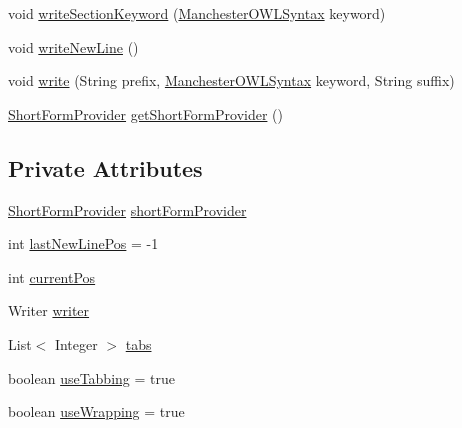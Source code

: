 \begin{DoxyCompactItemize}
\item 
void \hyperlink{classuk_1_1ac_1_1manchester_1_1cs_1_1owl_1_1owlapi_1_1mansyntaxrenderer_1_1_abstract_renderer_a13cf12a873d036bd6217b4041dea3419}{write\-Section\-Keyword} (\hyperlink{enumorg_1_1coode_1_1owlapi_1_1manchesterowlsyntax_1_1_manchester_o_w_l_syntax}{Manchester\-O\-W\-L\-Syntax} keyword)
\item 
void \hyperlink{classuk_1_1ac_1_1manchester_1_1cs_1_1owl_1_1owlapi_1_1mansyntaxrenderer_1_1_abstract_renderer_a52cc61092b255ec5af3b0dab25ab5085}{write\-New\-Line} ()
\item 
void \hyperlink{classuk_1_1ac_1_1manchester_1_1cs_1_1owl_1_1owlapi_1_1mansyntaxrenderer_1_1_abstract_renderer_a525f11fe2515b32080c6a259d7d00e04}{write} (String prefix, \hyperlink{enumorg_1_1coode_1_1owlapi_1_1manchesterowlsyntax_1_1_manchester_o_w_l_syntax}{Manchester\-O\-W\-L\-Syntax} keyword, String suffix)
\item 
\hyperlink{interfaceorg_1_1semanticweb_1_1owlapi_1_1util_1_1_short_form_provider}{Short\-Form\-Provider} \hyperlink{classuk_1_1ac_1_1manchester_1_1cs_1_1owl_1_1owlapi_1_1mansyntaxrenderer_1_1_abstract_renderer_a5b86bc36be03fdcee826a99cd2c1025b}{get\-Short\-Form\-Provider} ()
\end{DoxyCompactItemize}
\subsection*{Private Attributes}
\begin{DoxyCompactItemize}
\item 
\hyperlink{interfaceorg_1_1semanticweb_1_1owlapi_1_1util_1_1_short_form_provider}{Short\-Form\-Provider} \hyperlink{classuk_1_1ac_1_1manchester_1_1cs_1_1owl_1_1owlapi_1_1mansyntaxrenderer_1_1_abstract_renderer_af6154992d5c8bf7b61b409363d9459b5}{short\-Form\-Provider}
\item 
int \hyperlink{classuk_1_1ac_1_1manchester_1_1cs_1_1owl_1_1owlapi_1_1mansyntaxrenderer_1_1_abstract_renderer_aaca5c7b54ba4c4e421ce43fd1d3aa95e}{last\-New\-Line\-Pos} = -\/1
\item 
int \hyperlink{classuk_1_1ac_1_1manchester_1_1cs_1_1owl_1_1owlapi_1_1mansyntaxrenderer_1_1_abstract_renderer_a9be53e693982a32525f2896c3d851d8c}{current\-Pos}
\item 
Writer \hyperlink{classuk_1_1ac_1_1manchester_1_1cs_1_1owl_1_1owlapi_1_1mansyntaxrenderer_1_1_abstract_renderer_aa1198fed3e789d2e588e8c5708ecd539}{writer}
\item 
List$<$ Integer $>$ \hyperlink{classuk_1_1ac_1_1manchester_1_1cs_1_1owl_1_1owlapi_1_1mansyntaxrenderer_1_1_abstract_renderer_a055f141604ded02abf1377b8874d61d9}{tabs}
\item 
boolean \hyperlink{classuk_1_1ac_1_1manchester_1_1cs_1_1owl_1_1owlapi_1_1mansyntaxrenderer_1_1_abstract_renderer_a5b2a349c7ccc09bb3ee53e80952275de}{use\-Tabbing} = true
\item 
boolean \hyperlink{classuk_1_1ac_1_1manchester_1_1cs_1_1owl_1_1owlapi_1_1mansyntaxrenderer_1_1_abstract_renderer_a94b91733f23aa843bd3f93e1bf385b3f}{use\-Wrapping} = true
\end{DoxyCompactItemize}


